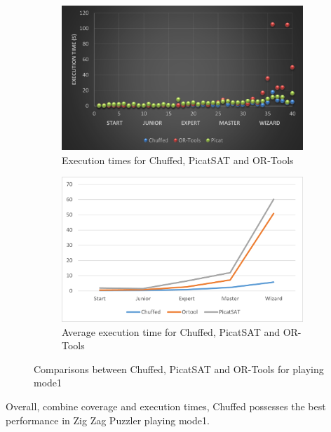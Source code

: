 \begin{figure}[htbp]
    \centering
    \begin{subfigure}[b]{0.48\textwidth}
     \includegraphics[width=\textwidth]{figs/time1three.png}
    \caption{Execution times for Chuffed, PicatSAT and OR-Tools}
    \label{fig:time1three}
    \end{subfigure}
    \begin{subfigure}[b]{0.48\textwidth}
     \includegraphics[width=\textwidth]{figs/mode1solverscomparison.png}
    \caption{Average execution time for Chuffed, PicatSAT and OR-Tools}
    \label{fig:time1threeslope}
    \end{subfigure}
    \caption{Comparisons between Chuffed, PicatSAT and OR-Tools for playing mode1}
\end{figure}
Overall, combine coverage and execution times, Chuffed possesses the best performance in Zig Zag Puzzler playing mode1.
